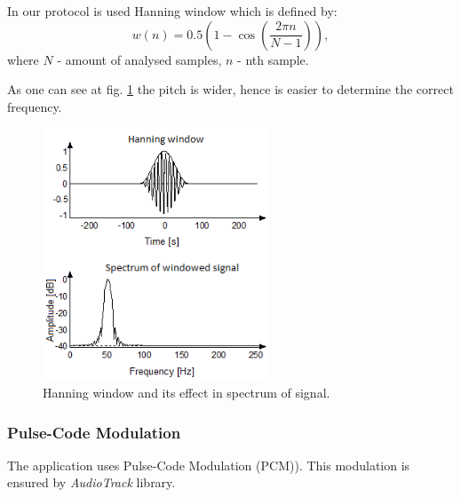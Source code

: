 \documentclass[11pt,titlepage]{article}
\theoremstyle{plain}
\begin{document}
\vspace{5mm}

In our protocol is used Hanning window which is defined by:
\begin{equation}
	 w(n) = 0.5 (1 - \cos\left(\frac{2 \pi n}{N - 1}\right)),
\end{equation}
\newline where $N$ - amount of analysed samples, $n$ - nth sample. 

\vspace{5mm}

As one can see at fig. \ref{fig:F10} the pitch is wider, hence is easier to determine the correct frequency.
\begin{figure}[H]
	\centering
	\includegraphics[width=0.6\textwidth]{img/hanning_window}
	\caption{Hanning window and its effect in spectrum of signal.}
	\label{fig:F10}
\end{figure}

\subsubsection{Pulse-Code Modulation}
The application uses Pulse-Code Modulation (PCM)). This modulation is ensured by \textit{AudioTrack} library.

\vspace{5mm}
\end{document}
